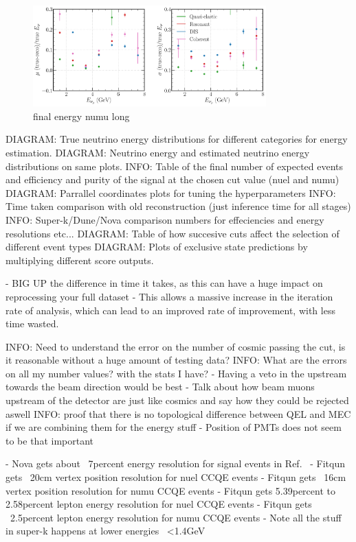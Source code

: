 \begin{figure} %
    \includegraphics[width=0.8\textwidth]{diagrams/7-cvn/chipsnet/final_energy_numu.pdf}
    \caption[final energy numu short]
    {final energy numu long}
    \label{fig:final_energy_numu}
\end{figure}

DIAGRAM: True neutrino energy distributions for different categories for energy estimation.
DIAGRAM: Neutrino energy and estimated neutrino energy distributions on same plots.
INFO: Table of the final number of expected events and efficiency and purity of the signal at the
chosen cut value (nuel and numu)
DIAGRAM: Parrallel coordinates plots for tuning the hyperparameters
INFO: Time taken comparison with old reconstruction (just inference time for all stages)
INFO: Super-k/Dune/Nova comparison numbers for effeciencies and energy resolutions etc...
DIAGRAM: Table of how succesive cuts affect the selection of different event types
DIAGRAM: Plots of exclusive state predictions by multiplying different score outputs.

- BIG UP the difference in time it takes, as this can have a huge impact on reprocessing your full
dataset
- This allows a massive increase in the iteration rate of analysis, which can lead to an improved
rate of improvement, with less time wasted.

INFO: Need to understand the error on the number of cosmic passing the cut, is it reasonable
without a huge amount of testing data?
INFO: What are the errors on all my number values? with the stats I have?
- Having a veto in the upstream towards the beam direction would be best
- Talk about how beam muons upstream of the detector are just like cosmics and say how they could
be rejected aswell
INFO: proof that there is no topological difference between QEL and MEC if we are combining them
for the energy stuff
- Position of PMTs does not seem to be that important

- Nova gets about ~7percent energy resolution for signal events
in Ref.~\cite{jiang2019}
- Fitqun gets ~20cm vertex position resolution for nuel CCQE events
- Fitqun gets ~16cm vertex position resolution for numu CCQE events
- Fitqun gets 5.39percent to 2.58percent lepton energy resolution for nuel CCQE events
- Fitqun gets ~2.5percent lepton energy resolution for numu CCQE events
- Note all the stuff in super-k happens at lower energies ~<1.4GeV

